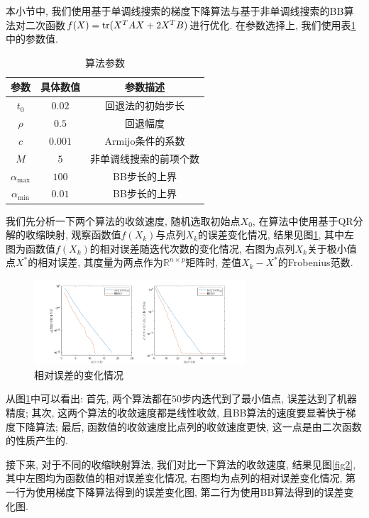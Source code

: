 \documentclass[UTF8]{ctexart}
\begin{document}
本小节中, 我们使用基于单调线搜索的梯度下降算法与基于非单调线搜索的BB算法对二次函数$f(X)=\textup{tr}(X^T AX+2X^T B)$进行优化. 在参数选择上, 我们使用表\ref{tab1}中的参数值. \par
\begin{table}[htbp]
    \centering
    \begin{tabular}{c|cc}
        \hline
        \hline
        参数 & 具体数值 & 参数描述\\
        \hline
        $t_0$ & $0.02$ & 回退法的初始步长\\
        $\rho$ & $0.5$ & 回退幅度\\
        $c$ & $0.001$ & Armijo条件的系数\\
        $M$ & $5$ & 非单调线搜索的前项个数\\
        $\alpha_{\max}$ & $100$ & BB步长的上界\\
        $\alpha_{\min}$ & $0.01$ & BB步长的上界\\
        \hline
        \hline
    \end{tabular}
    \caption{算法参数}\label{tab1}
\end{table}
我们先分析一下两个算法的收敛速度, 随机选取初始点$X_0$, 在算法中使用基于QR分解的收缩映射, 观察函数值$f(X_k)$与点列$X_k$的误差变化情况, 结果见图\ref{fig1}, 其中左图为函数值$f(X_k)$的相对误差随迭代次数的变化情况, 右图为点列$X_k$关于极小值点$X^*$的相对误差, 其度量为两点作为$\mathbb{R}^{n\times p}$矩阵时, 差值$X_k-X^*$的Frobenius范数. \par
\begin{figure}[htbp]
    \centering
    \includegraphics[width=0.7\textwidth]{Q2-figure/1.png}
    \caption{相对误差的变化情况}\label{fig1}
\end{figure}
从图\ref{fig1}中可以看出: 首先, 两个算法都在$50$步内迭代到了最小值点, 误差达到了机器精度; 其次, 这两个算法的收敛速度都是线性收敛, 且BB算法的速度要显著快于梯度下降算法; 最后, 函数值的收敛速度比点列的收敛速度更快, 这一点是由二次函数的性质产生的. \par
接下来, 对于不同的收缩映射算法, 我们对比一下算法的收敛速度, 结果见图\ref{fig2}, 其中左图均为函数值的相对误差变化情况, 右图均为点列的相对误差变化情况, 第一行为使用梯度下降算法得到的误差变化图, 第二行为使用BB算法得到的误差变化图. \par
\end{document}
